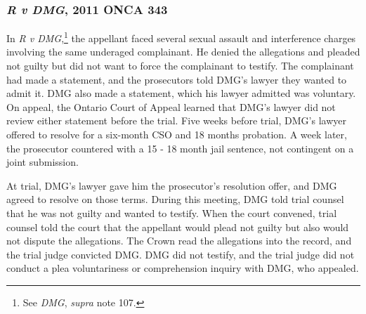 \subsubsection{\textit{R v DMG}, 2011 ONCA 343}

In \textit{R v DMG},\footnote{See \textit{DMG}, \textit{supra} note 107.} the appellant faced several sexual assault and interference charges involving the same underaged complainant. He denied the allegations and pleaded not guilty but did not want to force the complainant to testify. The complainant had made a statement, and the prosecutors told DMG's lawyer they wanted to admit it. DMG also made a statement, which his lawyer admitted was voluntary. On appeal, the Ontario Court of Appeal learned that DMG's lawyer did not review either statement before the trial. Five weeks before trial, DMG's lawyer offered to resolve for a six-month CSO and 18 months probation. A week later, the prosecutor countered with a 15 - 18 month jail sentence, not contingent on a joint submission. 

At trial, DMG's lawyer gave him the prosecutor's resolution offer, and DMG agreed to resolve on those terms. During this meeting, DMG told trial counsel that he was not guilty and wanted to testify. When the court convened, trial counsel told the court that the appellant would plead not guilty but also would not dispute the allegations. The Crown read the allegations into the record, and the trial judge convicted DMG. DMG did not testify, and the trial judge did not conduct a plea voluntariness or comprehension inquiry with DMG, who appealed.

